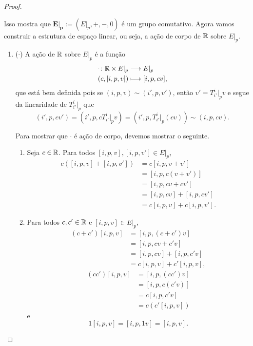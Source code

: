 \begin{proof}
\begin{enumerate}
Isso mostra que $\bm{E|_p} := (E|_p,+,-,0)$ é um grupo comutativo. Agora vamos construir a estrutura de espaço linear, ou seja, a ação de corpo de $\mathbb{R}$ sobre $E|_p$.

\begin{enumerate}
\item ($\cdot$) A ação de $\mathbb{R}$ sobre $E|_p$ é a função
	\begin{align*}
	{\cdot}\colon {\mathbb{R}\times E|_p} &\longrightarrow {E|_p} \\{(c,[i,p,v])} &\longmapsto [i,p,cv],
	\end{align*}
que está bem definida pois se $(i,p,v) \sim (i',p,v')$, então $v' = T^i_{i'}|_p v$ e segue da linearidade de $T^i_{i'}|_p$ que
	\begin{equation*}
	(i',p,cv') = (i',p,cT^i_{i'}|_p v) = (i',p,T^i_{i'}|_p (cv)) \sim (i,p,cv).
	\end{equation*}

Para mostrar que $\cdot$ é ação de corpo, devemos mostrar o seguinte.
	\begin{enumerate}
	\item Seja $c \in \mathbb{R}$. Para todos $[i,p,v], [i,p,v'] \in E|_p$,
		\begin{align*}
		c([i,p,v] + [i,p,v']) &= c[i,p,v+ v'] \\
			&= [i,p,c(v+v')] \\
			&= [i,p,cv+cv'] \\
			&= [i,p,cv] + [i,p,cv'] \\
			&= c[i,p,v] + c[i,p,v'].
		\end{align*}

	\item Para todos $c,c' \in \mathbb{R}$ e $[i,p,v] \in E|_p$,
		\begin{align*}
		(c+c')[i,p,v] &= [i,p,(c+c')v] \\
			&= [i,p,cv + c'v] \\
			&= [i,p,cv] + [i,p,c'v] \\
			&= c[i,p,v] + c'[i,p,v],
		\end{align*}
		\begin{align*}
		(cc')[i,p,v] &= [i,p,(cc')v] \\
			&= [i,p,c(c'v)] \\
			&= c[i,p,c'v] \\
			&= c(c'[i,p,v])
		\end{align*}
e
		\begin{equation*}
		1[i,p,v] = [i,p,1v] = [i,p,v].
		\end{equation*}
	\end{enumerate}
\end{enumerate}


\end{enumerate}
\end{proof}
